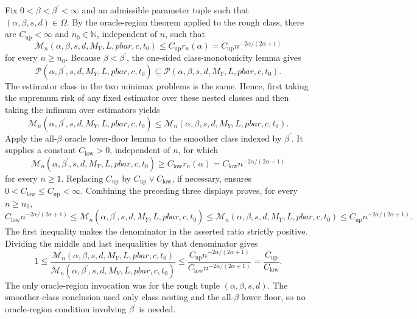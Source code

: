 Fix \(0<\beta<\beta^{\prime}<\infty\) and an admissible parameter tuple such that \((\alpha,\beta,s,d)\in\Omega\). By the oracle-region theorem applied to the rough class, there are \(C_{\mathrm{up}}<\infty\) and \(n_0\in\mathbb N\), independent of \(n\), such that
\[
\mathcal M_n(\alpha,\beta,s,d,M_Y,L,pbar,c,t_0)
\le C_{\mathrm{up}}r_n(\alpha)
=C_{\mathrm{up}}n^{-2\alpha/(2\alpha+1)}
\]
for every \(n\ge n_0\). Because \(\beta<\beta^{\prime}\), the one-sided class-monotonicity lemma gives
\[
\mathcal P(\alpha,\beta^{\prime},s,d,M_Y,L,pbar,c,t_0)
\subseteq
\mathcal P(\alpha,\beta,s,d,M_Y,L,pbar,c,t_0).
\]
The estimator class in the two minimax problems is the same. Hence, first taking the supremum risk of any fixed estimator over these nested classes and then taking the infimum over estimators yields
\[
\mathcal M_n(\alpha,\beta^{\prime},s,d,M_Y,L,pbar,c,t_0)
\le
\mathcal M_n(\alpha,\beta,s,d,M_Y,L,pbar,c,t_0).
\]
Apply the all-\(\beta\) oracle lower-floor lemma to the smoother class indexed by \(\beta^{\prime}\). It supplies a constant \(C_{\mathrm{low}}>0\), independent of \(n\), for which
\[
\mathcal M_n(\alpha,\beta^{\prime},s,d,M_Y,L,pbar,c,t_0)
\ge C_{\mathrm{low}}r_n(\alpha)
=C_{\mathrm{low}}n^{-2\alpha/(2\alpha+1)}
\]
for every \(n\ge1\). Replacing \(C_{\mathrm{up}}\) by \(C_{\mathrm{up}}\vee C_{\mathrm{low}}\), if necessary, ensures \(0<C_{\mathrm{low}}\le C_{\mathrm{up}}<\infty\). Combining the preceding three displays proves, for every \(n\ge n_0\),
\[
C_{\mathrm{low}}n^{-2\alpha/(2\alpha+1)}
\le \mathcal M_n(\alpha,\beta^{\prime},s,d,M_Y,L,pbar,c,t_0)
\le \mathcal M_n(\alpha,\beta,s,d,M_Y,L,pbar,c,t_0)
\le C_{\mathrm{up}}n^{-2\alpha/(2\alpha+1)}.
\]
The first inequality makes the denominator in the asserted ratio strictly positive. Dividing the middle and last inequalities by that denominator gives
\[
1\le
\frac{\mathcal M_n(\alpha,\beta,s,d,M_Y,L,pbar,c,t_0)}
{\mathcal M_n(\alpha,\beta^{\prime},s,d,M_Y,L,pbar,c,t_0)}
\le
\frac{C_{\mathrm{up}}n^{-2\alpha/(2\alpha+1)}}
{C_{\mathrm{low}}n^{-2\alpha/(2\alpha+1)}}
=\frac{C_{\mathrm{up}}}{C_{\mathrm{low}}}.
\]
The only oracle-region invocation was for the rough tuple \((\alpha,\beta,s,d)\). The smoother-class conclusion used only class nesting and the all-\(\beta\) lower floor, so no oracle-region condition involving \(\beta^{\prime}\) is needed.